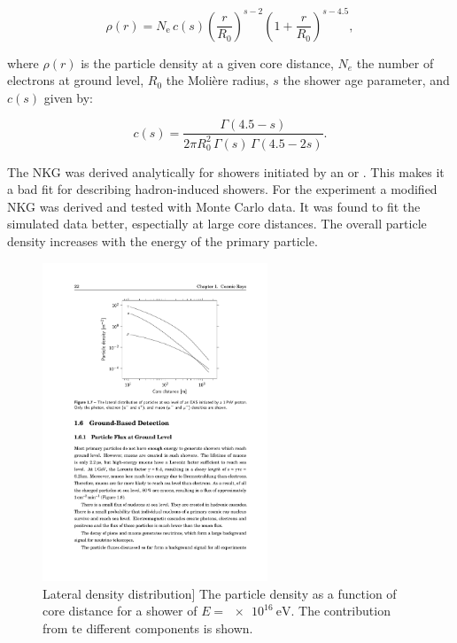 \begin{equation}
    \label{eq:nkg}
    \rho(r) = N_\mathrm{e}\, c(s) \left(\frac{r}{R_0}\right)^{s - 2} \left(1 +
    \frac{r}{R_0}\right)^{s - 4.5},
\end{equation}

where $\rho(r)$ is the particle density at a given core distance, $N_e$ the number of electrons at ground level, $R_0$ the Molière radius, $s$ the shower age parameter, and $c(s)$ given by:

\begin{equation}
    c(s) = \frac{\Gamma(4.5 - s)}{2\pi R_0^2\, \Gamma(s)\,\Gamma(4.5 - 2s)}.
\end{equation}

The NKG was derived analytically for showers initiated by an \Pelectron or \Pphoton. This makes it a bad fit for describing hadron-induced showers. For the \kascade experiment a modified NKG was derived and tested with Monte Carlo data. It was found to fit the simulated data better, espectially at large core distances. The overall particle density increases with the energy of the primary particle.

\begin{figure}
    \centering
    \includegraphics[width=0.6\textwidth]
                    {plots/cosmic-rays/ldf}
    \caption{Lateral density distribution]
The particle density as a function of core distance for a shower of $E = \SI{e16}{\eV}$. The contribution from te different components is shown.}
    \label{fig:ldf}
\end{figure}


